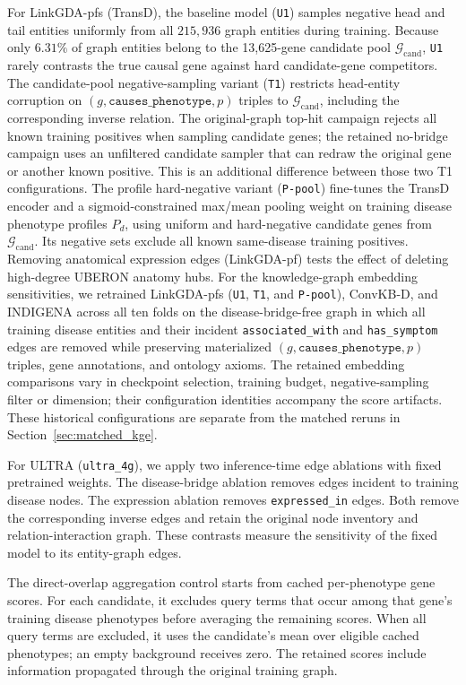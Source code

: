 \documentclass{article}
\newcommand{\method}{LinkGDA}
\begin{document}
For \method{}-pfs (TransD), the baseline model (\texttt{U1}) samples negative
head and tail entities uniformly from all $215{,}936$ graph entities during
training. Because only $6.31\%$ of graph entities belong to the 13{,}625-gene
candidate pool $\mathcal{G}_{\mathrm{cand}}$, \texttt{U1} rarely contrasts the
true causal gene against hard candidate-gene competitors. The candidate-pool
negative-sampling variant (\texttt{T1}) restricts head-entity corruption on
$(g,\texttt{causes\_phenotype},p)$ triples to $\mathcal{G}_{\mathrm{cand}}$,
including the corresponding inverse relation. The original-graph top-hit
campaign rejects all known training positives when sampling candidate genes;
the retained no-bridge campaign uses an unfiltered candidate sampler that can
redraw the original gene or another known positive. This is an additional
difference between those two T1 configurations. The profile hard-negative
variant (\texttt{P-pool}) fine-tunes the TransD encoder and a sigmoid-constrained
max/mean pooling weight on training disease phenotype profiles $P_d$, using
uniform and hard-negative candidate genes from $\mathcal{G}_{\mathrm{cand}}$.
Its negative sets exclude all known same-disease training positives.
Removing anatomical expression edges
(\method{}-pf) tests the effect of deleting high-degree UBERON anatomy hubs.
For the knowledge-graph embedding sensitivities,
we retrained \method{}-pfs (\texttt{U1}, \texttt{T1}, and \texttt{P-pool}),
ConvKB-D, and INDIGENA across all ten folds on the disease-bridge-free graph in
which all training disease entities and their incident \texttt{associated\_with}
and \texttt{has\_symptom} edges are removed while preserving materialized
$(g,\texttt{causes\_phenotype},p)$ triples, gene annotations, and ontology
axioms. The retained embedding comparisons vary in checkpoint selection,
training budget, negative-sampling filter or dimension; their configuration
identities accompany the score artifacts.
These historical configurations are separate from the matched reruns in
Section~\ref{sec:matched_kge}.

For ULTRA (\texttt{ultra\_4g}), we apply two inference-time edge ablations
with fixed pretrained weights. The disease-bridge ablation removes edges
incident to training disease nodes. The expression ablation removes
\texttt{expressed\_in} edges. Both remove the corresponding inverse edges and
retain the original node inventory and relation-interaction graph. These
contrasts measure the sensitivity of the fixed model to its entity-graph edges.

The direct-overlap aggregation control starts from cached per-phenotype gene
scores. For each candidate, it excludes query terms that occur among that gene's
training disease phenotypes before averaging the remaining scores. When all
query terms are excluded, it uses the candidate's mean over eligible cached
phenotypes; an empty background receives zero. The retained scores include
information propagated through the original training graph.
\end{document}
